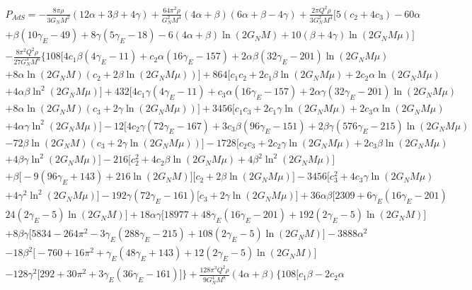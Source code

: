 \documentclass[10pt,a4paper]{article}
\begin{document}
\begin{multline}
    P_{AdS}=-\frac{8\pi\rho}{3G_NM^2}(12\alpha+3\beta+4\gamma)+\frac{64\pi^2\rho}{G_N^2M^4}(4\alpha+\beta)(6\alpha+\beta-4\gamma)
    +\frac{2\pi Q^2\rho}{3G_N^2M^4}\Big[5(c_2+4c_3)-60\alpha\\+\beta(10\gamma_E-49)+8\gamma(5\gamma_E-18)-6(4\alpha+\beta)\ln(2G_NM)+10(\beta+4\gamma)\ln(2G_NM\mu)\Big]\\
    -\frac{8\pi^2Q^2\rho}{27G_N^3M^6}\bigg\{108\Big[4c_1\beta(4\gamma_E-11)+c_2\alpha(16\gamma_E-157)+2\alpha\beta(32\gamma_E-201)\ln(2G_NM\mu)\\
    +8\alpha\ln(2G_NM)\left(c_2+2\beta\ln(2G_NM\mu)\right)\Big]+864\Big[c_1c_2+2c_1\beta\ln(2G_NM\mu)+2c_2\alpha\ln(2G_NM\mu)\\
    +4\alpha\beta\ln^2(2G_NM\mu)\Big]+432\Big[4c_1\gamma(4\gamma_E-11)+c_3\alpha(16\gamma_E-157)+2\alpha\gamma(32\gamma_E-201)\ln(2G_NM\mu)\\
    +8\alpha\ln(2G_NM)\left(c_3+2\gamma\ln(2G_NM\mu)\right)\Big]+3456\Big[c_1c_3+2c_1\gamma\ln(2G_NM\mu)+2c_3\alpha\ln(2G_NM\mu)\\
    +4\alpha\gamma\ln^2(2G_NM\mu)\Big]-12\Big[4c_2\gamma(72\gamma_E-167)+3c_3\beta(96\gamma_E-151)+2\beta\gamma(576\gamma_E-215)\ln(2G_NM\mu)\\
    -72\beta\ln(2G_NM)\left(c_3+2\gamma\ln(2G_NM\mu)\right)\Big]-1728\Big[c_2c_3+2c_2\gamma\ln(2G_NM\mu)+2c_3\beta\ln(2G_NM\mu)\\
    +4\beta\gamma\ln^2(2G_NM\mu)\Big]-216\Big[c^2_2+4c_2\beta\ln(2G_NM\mu)+4\beta^2\ln^2(2G_NM\mu)\Big]\\
    +\beta\Big[-9(96\gamma_E+143)+216\ln(2G_NM)\Big]\Big[c_2+2\beta\ln(2G_NM\mu)\Big]-3456\Big[c^2_3+4c_3\gamma\ln(2G_NM\mu)\\
    +4\gamma^2\ln^2(2G_NM\mu)\Big]-192\gamma(72\gamma_E-161)\Big[c_3+2\gamma\ln(2G_NM\mu)\Big]+36\alpha\beta\Big[2309+6\gamma_E(16\gamma_E-201)\\
    24(2\gamma_E-5)\ln(2G_NM)\Big]+18\alpha\gamma\Big[18977+48\gamma_E(16\gamma_E-201)+192(2\gamma_E-5)\ln(2G_NM)\Big]\\
    +8\beta\gamma\Big[5834-264\pi^2-3\gamma_E(288\gamma_E-215)+108(2\gamma_E-5)\ln(2G_NM)\Big]-3888\alpha^2\\
    -18\beta^2\Big[-760+16\pi^2+\gamma_E(48\gamma_E+143)+12(2\gamma_E-5)\ln(2G_NM)\Big]\\
    -128\gamma^2\Big[292+30\pi^2+3\gamma_E(36\gamma_E-161)\Big]\bigg\}+\frac{128\pi^3Q^2\rho}{9G_N^4M^8}(4\alpha+\beta)\bigg\{108\Big[c_1\beta-2c_2\alpha\\

\end{multline}
\end{document}
